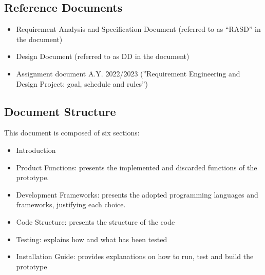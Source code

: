\subsection{Reference Documents}
\begin{itemize}
    \item Requirement Analysis and Specification Document (referred to as “RASD” in the document)
    \item Design Document (referred to as DD in the document)
    \item Assignment document A.Y. 2022/2023 (”Requirement Engineering and Design Project: goal, schedule
          and rules”)
\end{itemize}
\subsection{Document Structure}
This document is composed of six sections:
\begin{itemize}
    \item Introduction
    \item Product Functions: presents the implemented and discarded functions of the prototype.
    \item Development Frameworks: presents the adopted programming languages and frameworks, justifying each choice.
    \item Code Structure: presents the structure of the code
    \item Testing: explains how and what has been tested
    \item Installation Guide: provides explanations on how to run, test and build the prototype
\end{itemize}